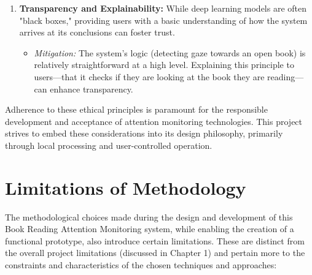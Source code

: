 \begin{enumerate}
    \item \textbf{Transparency and Explainability:} While deep learning models are often "black boxes," providing users with a basic understanding of how the system arrives at its conclusions can foster trust.
    \begin{itemize}
        \item \textit{Mitigation:} The system's logic (detecting gaze towards an open book) is relatively straightforward at a high level. Explaining this principle to users—that it checks if they are looking at the book they are reading—can enhance transparency.
    \end{itemize}
\end{enumerate}
Adherence to these ethical principles is paramount for the responsible development and acceptance of attention monitoring technologies. This project strives to embed these considerations into its design philosophy, primarily through local processing and user-controlled operation.


\section{Limitations of Methodology}
The methodological choices made during the design and development of this Book Reading Attention Monitoring system, while enabling the creation of a functional prototype, also introduce certain limitations. These are distinct from the overall project limitations (discussed in Chapter 1) and pertain more to the constraints and characteristics of the chosen techniques and approaches:

